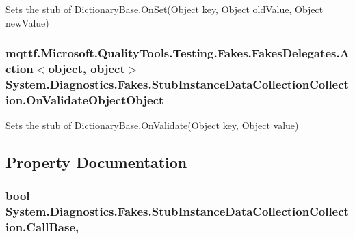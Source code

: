 Sets the stub of Dictionary\-Base.\-On\-Set(\-Object key, Object old\-Value, Object new\-Value)

\hypertarget{class_system_1_1_diagnostics_1_1_fakes_1_1_stub_instance_data_collection_collection_a051dde65d816a1a086d0333ed0f26fcf}{
\subsubsection[{On\-Validate\-Object\-Object}]{\setlength{\rightskip}{0pt plus 5cm}mqttf.\-Microsoft.\-Quality\-Tools.\-Testing.\-Fakes.\-Fakes\-Delegates.\-Action$<$object, object$>$ System.\-Diagnostics.\-Fakes.\-Stub\-Instance\-Data\-Collection\-Collection.\-On\-Validate\-Object\-Object}}\label{class_system_1_1_diagnostics_1_1_fakes_1_1_stub_instance_data_collection_collection_a051dde65d816a1a086d0333ed0f26fcf}


Sets the stub of Dictionary\-Base.\-On\-Validate(\-Object key, Object value)



\subsection{Property Documentation}
\hypertarget{class_system_1_1_diagnostics_1_1_fakes_1_1_stub_instance_data_collection_collection_a5f76a80e4cb8efdd552c48dced95e288}{
\subsubsection[{Call\-Base}]{\setlength{\rightskip}{0pt plus 5cm}bool System.\-Diagnostics.\-Fakes.\-Stub\-Instance\-Data\-Collection\-Collection.\-Call\-Base\hspace{0.3cm}{\ttfamily [get]}, {\ttfamily [set]}}}\label{class_system_1_1_diagnostics_1_1_fakes_1_1_stub_instance_data_collection_collection_a5f76a80e4cb8efdd552c48dced95e288}



